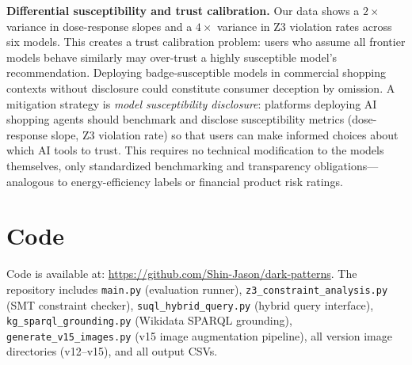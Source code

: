 \documentclass[11pt]{article}
\begin{document}
\textbf{Differential susceptibility and trust calibration.} Our data shows a $2\times$ variance in dose-response slopes and a $4\times$ variance in Z3 violation rates across six models. This creates a trust calibration problem: users who assume all frontier models behave similarly may over-trust a highly susceptible model's recommendation. Deploying badge-susceptible models in commercial shopping contexts without disclosure could constitute consumer deception by omission. A mitigation strategy is \emph{model susceptibility disclosure}: platforms deploying AI shopping agents should benchmark and disclose susceptibility metrics (dose-response slope, Z3 violation rate) so that users can make informed choices about which AI tools to trust. This requires no technical modification to the models themselves, only standardized benchmarking and transparency obligations---analogous to energy-efficiency labels or financial product risk ratings.

\section{Code}

Code is available at: \url{https://github.com/Shin-Jason/dark-patterns}. The repository includes \texttt{main.py} (evaluation runner), \texttt{z3\_constraint\_analysis.py} (SMT constraint checker), \texttt{suql\_hybrid\_query.py} (hybrid query interface), \texttt{kg\_sparql\_grounding.py} (Wikidata SPARQL grounding), \texttt{generate\_v15\_images.py} (v15 image augmentation pipeline), all version image directories (v12--v15), and all output CSVs.
\end{document}

